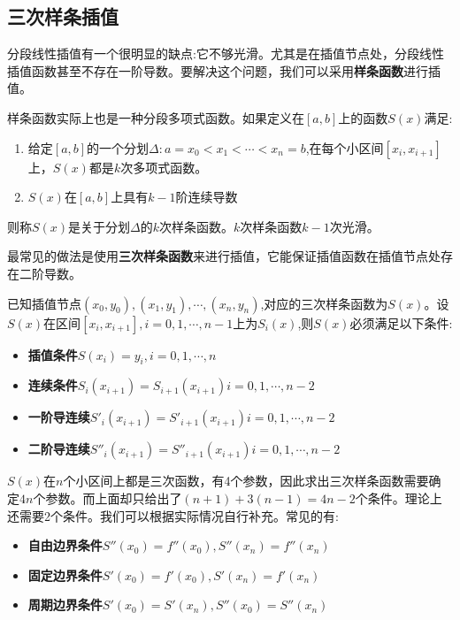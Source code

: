 \documentclass[withoutpreface]{cumcmthesis}
\begin{document}
\subsection{三次样条插值}

分段线性插值有一个很明显的缺点:它不够光滑。尤其是在插值节点处，分段线性插值函数甚至不存在一阶导数。要解决这个问题，我们可以采用\textbf{样条函数}进行插值。

\begin{definition}[样条函数]
    样条函数实际上也是一种分段多项式函数。如果定义在$[a,b]$上的函数$S(x)$满足:
    \begin{enumerate}
        \item 给定$[a,b]$的一个分划$\Delta:a=x_0<x_1<\cdots<x_n=b$,在每个小区间$[x_i,x_{i+1}]$上，$S(x)$都是$k$次多项式函数。
        \item $S(x)$在$[a,b]$上具有$k-1$阶连续导数
    \end{enumerate}
    则称$S(x)$是关于分划$\Delta$的$k$次样条函数。$k$次样条函数$k-1$次光滑。
\end{definition}

\vspace{-0.4cm}
最常见的做法是使用\textbf{三次样条函数}来进行插值，它能保证插值函数在插值节点处存在二阶导数。

已知插值节点$(x_0,y_0),(x_1,y_1),\cdots,(x_n,y_n)$,对应的三次样条函数为$S(x)$。设$S(x)$在区间$[x_i,x_{i+1}],i=0,1,\cdots,n-1$上为$S_i(x)$,则$S(x)$必须满足以下条件:

\begin{itemize}
    \item \textbf{插值条件}\quad $S(x_i)=y_i,i=0,1,\cdots,n$
    \item \textbf{连续条件}\quad $S_i(x_{i+1})=S_{i+1}(x_{i+1}) i=0,1,\cdots,n-2$
    \item \textbf{一阶导连续}\quad $S'_i(x_{i+1})=S'_{i+1}(x_{i+1}) i=0,1,\cdots,n-2$
    \item \textbf{二阶导连续}\quad $S''_i(x_{i+1})=S''_{i+1}(x_{i+1}) i=0,1,\cdots,n-2$
\end{itemize}

$S(x)$在$n$个小区间上都是三次函数，有4个参数，因此求出三次样条函数需要确定$4n$个参数。而上面却只给出了$(n+1)+3(n-1)=4n-2$个条件。理论上还需要2个条件。我们可以根据实际情况自行补充。常见的有:
\begin{itemize}
    \item \textbf{自由边界条件}\quad $S''(x_0)=f''(x_0),S''(x_n)=f''(x_n)$
    \item   \textbf{固定边界条件}\quad $S'(x_0)=f'(x_0),S'(x_n)=f'(x_n)$
    \item \textbf{周期边界条件}\quad $S'(x_0)=S'(x_n),S''(x_0)=S''(x_n)$
\end{itemize}
\end{document}
